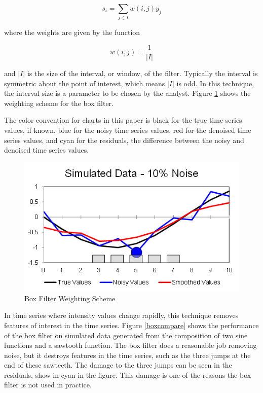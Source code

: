 \documentclass[11pt]{article}
\theoremstyle{definition}
\begin{document}
\begin{displaymath}
s_i = \sum _{j \in I} w \left(i, j \right) y_j
\end{displaymath}

\noindent
where the weights are given by the function

\begin{displaymath}
w\left(i, j\right) = \frac{1}{\lvert I \rvert}
\end{displaymath}

\noindent
and $\lvert I \rvert$ is the size of the interval, or window, of the filter. Typically the interval is symmetric about the point of interest, which means $\lvert I \rvert$ is odd. In this technique, the interval size is a parameter to be chosen by the analyst. Figure \ref{boxdemo} shows the weighting scheme for the box filter.

The color convention for charts in this paper is black for the true time series values, if known, blue for the noisy time series values, red for the denoised time series values, and cyan for the residuals, the difference between the noisy and denoised time series values.

\begin{figure}
\centering
\includegraphics[width = 0.65 \textwidth]{BoxDemo.png}
\caption{Box Filter Weighting Scheme}
\label{boxdemo}
\end{figure}

In time series where intensity values change rapidly, this technique removes features of interest in the time series. Figure \ref{boxcompare} shows the performance of the box filter on simulated data generated from the composition of two sine functions and a sawtooth function. The box filter does a reasonable job removing noise, but it destroys features in the time series, such as the three jumps at the end of these sawteeth. The damage to the three jumps can be seen in the residuals, show in cyan in the figure. This damage is one of the reasons the box filter is not used in practice.
\end{document}
